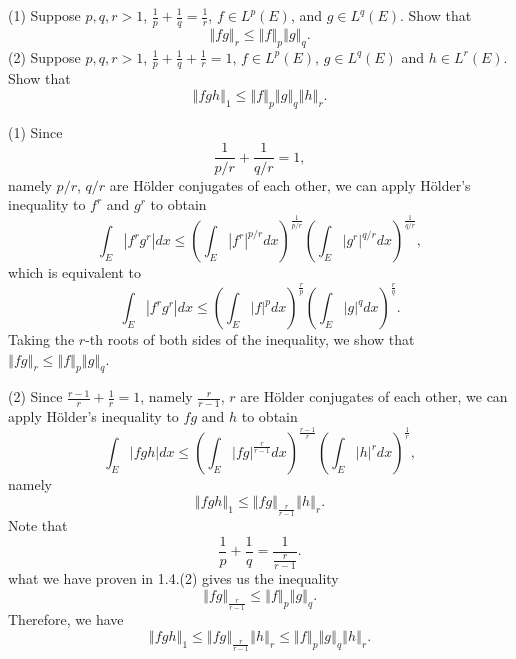 \documentclass[12pt,letterpaper,boxed]{hmcpset}
\begin{document}
\begin{problem}[1.4]
	(1) Suppose $p,q,r>1$, $\frac{1}{p}+\frac{1}{q}=\frac{1}{r}$, $f\in L^p(E)$, and $g\in L^q(E)$. Show that 
	\[
		\left\Vert fg\right\Vert_r\le \left\Vert f\right\Vert_p\left\Vert g\right\Vert_q.
	\]
	(2) Suppose $p,q,r>1$, $\frac{1}{p}+\frac{1}{q}+\frac{1}{r}=1$, $f\in L^p(E)$, $g\in L^q(E)$ and $h\in L^r(E)$. Show that 
	\[
		\left\Vert fgh\right\Vert_1\le 
		\left\Vert f\right\Vert_p
		\left\Vert g\right\Vert_q
		\left\Vert h\right\Vert_r.
	\]
\end{problem}
\begin{solution}
(1) Since 
\[
	\frac{1}{p/r}+\frac{1}{q/r}=1,
\]
namely $p/r$, $q/r$ are Hölder conjugates of each other, we can apply Hölder's inequality to $f^r$ and $g^r$ to obtain
\[
	\int_E\left|f^rg^r\right|dx\le\left(\int_E\left|f^r\right|^{p/r}dx\right)^{\frac{1}{p/r}}\left(\int_E\left|g^r\right|^{q/r}dx\right)^{\frac{1}{q/r}},
\]
which is equivalent to
\[
	\int_E\left|f^rg^r\right|dx\le\left(\int_E\left|f\right|^pdx\right)^{\frac{r}{p}}\left(\int_E\left|g\right|^{q}dx\right)^{\frac{r}{q}}.
\]
Taking the $r$-th roots of both sides of the inequality, we show that $\left\Vert fg\right\Vert_r\le \left\Vert f\right\Vert_p\left\Vert g\right\Vert_q$.

\noindent (2) Since $\frac{r-1}{r}+\frac{1}{r}=1$, namely $\frac{r}{r-1}$, $r$ are Hölder conjugates of each other, we can apply Hölder's inequality to $fg$ and $h$ to obtain
\[
	\int_E\left|fgh\right|dx\le
	\left(\int_E\left|fg\right|^{\frac{r}{r-1}}dx\right)^{\frac{r-1}{r}}
	\left(\int_E\left|h\right|^{r}dx\right)^{\frac{1}{r}},
\]
namely
\[
	\left\Vert fgh\right\Vert_1\le 
	\left\Vert fg\right\Vert_{\frac{r}{r-1}}
	\left\Vert h\right\Vert_r.
\]
Note that 
\[
	\frac{1}{p}+\frac{1}{q}=\frac{1}{\frac{r}{r-1}}.
\]
what we have proven in 1.4.(2) gives us the inequality
\[
	\left\Vert fg\right\Vert_{\frac{r}{r-1}}\le \left\Vert f\right\Vert_p\left\Vert g\right\Vert_q.
\]
Therefore, we have
\[
	\left\Vert fgh\right\Vert_1\le
	\left\Vert fg\right\Vert_{\frac{r}{r-1}}
	\left\Vert h\right\Vert_r\le
	\left\Vert f\right\Vert_p
	\left\Vert g\right\Vert_q
	\left\Vert h\right\Vert_r.
\] 
\end{solution}
\end{document}
